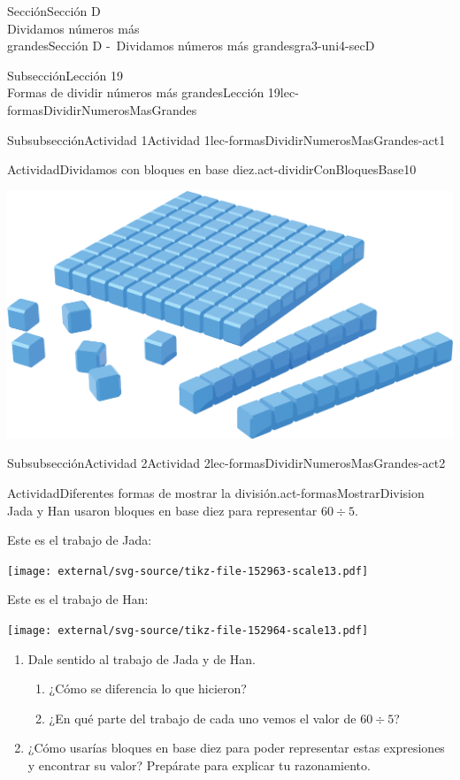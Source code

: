 \begin{sectionptx}{Sección}{{\Large Sección D\\}Dividamos números más\\grandes}{}{Sección D -~Dividamos números más grandes}{}{}{gra3-uni4-secD}
\begin{subsectionptx}{Subsección}{{\normalsize Lección 19\\[-0.05cm]}Formas de dividir números más grandes}{}{Lección 19}{}{}{lec-formasDividirNumerosMasGrandes}
\begin{subsubsectionptx}{Subsubsección}{Actividad 1}{}{Actividad 1}{}{}{lec-formasDividirNumerosMasGrandes-act1}
\begin{activity}{Actividad}{Dividamos con bloques en base diez.}{act-dividirConBloquesBase10}
\begin{sidebyside}{2}{0}{0}{0.1}
\begin{sbspanel}{0.2}
\includegraphics[max width=\linewidth, center]{external/png-source/CS 3.4 Lesson 19 Activity 1.png}
\end{sbspanel}%
\end{sidebyside}%
\end{activity}%
\end{subsubsectionptx}
%
%
\typeout{************************************************}
\typeout{************************************************}
%
\begin{subsubsectionptx}{Subsubsección}{Actividad 2}{}{Actividad 2}{}{}{lec-formasDividirNumerosMasGrandes-act2}
\begin{activity}{Actividad}{Diferentes formas de mostrar la división.}{act-formasMostrarDivision}%
Jada y Han usaron bloques en base diez para representar \(60 \div 5\).%
\par
Este es el trabajo de Jada:%
\begin{image}{0}{1}{0}{}%
\texttt{[image: external/svg-source/tikz-file-152963-scale13.pdf]}
\end{image}%
Este es el trabajo de Han:%
\begin{image}{0}{1}{0}{}%
\texttt{[image: external/svg-source/tikz-file-152964-scale13.pdf]}
\end{image}%
%
\begin{enumerate}
\item{}Dale sentido al trabajo de Jada y de Han.%
%
\begin{enumerate}
\item{}¿Cómo se diferencia lo que hicieron?%
\item{}¿En qué parte del trabajo de cada uno vemos el valor de \(60 \div 5\)?%
\end{enumerate}
\item{}¿Cómo usarías bloques en base diez para poder representar estas expresiones y encontrar su valor? Prepárate para explicar tu razonamiento.%

\end{enumerate}
\end{activity}
\end{subsubsectionptx}
\end{subsectionptx}
\end{sectionptx}
